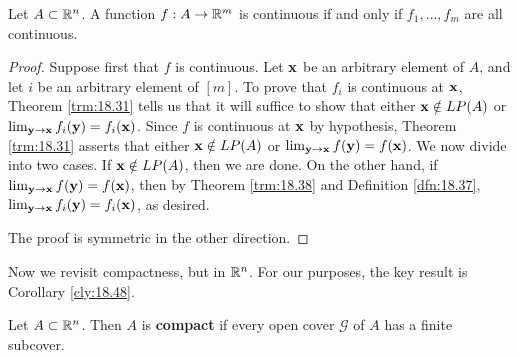 \documentclass[../main.tex]{subfiles}
\begin{document}
\begin{corollary}\label{cly:18.39}
    Let $A\subset\mathbb{R}^n$. A function $f:A\to\mathbb{R}^m$ is continuous if and only if $f_1,\dots,f_m$ are all continuous.
    \begin{proof}
        Suppose first that $f$ is continuous. Let $\mathbf{x}$ be an arbitrary element of $A$, and let $i$ be an arbitrary element of $[m]$. To prove that $f_i$ is continuous at $\mathbf{x}$, Theorem \ref{trm:18.31} tells us that it will suffice to show that either $\mathbf{x}\notin LP(A)$ or $\lim_{\mathbf{y}\to\mathbf{x}}f_i(\mathbf{y})=f_i(\mathbf{x})$. Since $f$ is continuous at $\mathbf{x}$ by hypothesis, Theorem \ref{trm:18.31} asserts that either $\mathbf{x}\notin LP(A)$ or $\lim_{\mathbf{y}\to\mathbf{x}}f(\mathbf{y})=f(\mathbf{x})$. We now divide into two cases. If $\mathbf{x}\notin LP(A)$, then we are done. On the other hand, if $\lim_{\mathbf{y}\to\mathbf{x}}f(\mathbf{y})=f(\mathbf{x})$, then by Theorem \ref{trm:18.38} and Definition \ref{dfn:18.37}, $\lim_{\mathbf{y}\to\mathbf{x}}f_i(\mathbf{y})=f_i(\mathbf{x})$, as desired.\par
        The proof is symmetric in the other direction.
    \end{proof}
\end{corollary}

Now we revisit compactness, but in $\mathbb{R}^n$. For our purposes, the key result is Corollary \ref{cly:18.48}.

\begin{definition}\label{dfn:18.40}
    Let $A\subset\mathbb{R}^n$. Then $A$ is \textbf{compact} if every open cover $\mathcal{G}$ of $A$ has a finite subcover.
\end{definition}
\end{document}
